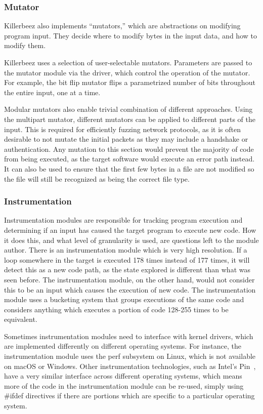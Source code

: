 \subsubsection{Mutator} \label{Mutator Overview}
Killerbeez also implements ``mutators,'' which are abstractions on modifying
program input. They decide where to modify bytes in the input data, and how
to modify them.

Killerbeez uses a selection of user-selectable mutators. Parameters are passed
to the mutator module via the driver, which control the operation of the
mutator. For example, the bit flip mutator flips a parametrized number of bits
throughout the entire input, one at a time.

Modular mutators also enable trivial combination of different approaches. Using
the multipart mutator, different mutators can be applied to different parts of
the input. This is required for efficiently fuzzing network protocols, as it is
often desirable to not mutate the initial packets as they may include a handshake or
authentication.  Any mutation to this section would prevent the majority of code from being
executed, as the target software would execute an error path instead. It can
also be used to ensure that the first few bytes in a file are not modified so
the file will still be recognized as being the correct file type.


\subsubsection{Instrumentation} \label{Instrumentation Overview}
Instrumentation modules are responsible for tracking program execution and
determining if an input has caused the target program to execute new code. How it does this,
and what level of granularity is used, are questions left to the module author.
There is an \IPT{} instrumentation module which is very high resolution.
If a loop somewhere in the target is executed 178 times instead of 177
times, it will detect this as a new code path, as the state explored is
different than what was seen before.  The \AFL{} instrumentation module, on the
other hand, would not consider this to be an input which causes the execution of new code.
The \AFL{} instrumentation module uses a bucketing system that groups executions of the same
code and considers anything which executes a portion of code 128-255 times to
be equivalent.

Sometimes instrumentation modules need to interface with kernel drivers, which are
implemented differently on different operating systems. For instance, the \IPT{}
instrumentation module uses the perf subsystem on Linux, which is not available
on macOS or Windows. Other instrumentation technologies, such as Intel's
Pin~\cite{pin}, have a very similar interface across different operating
systems, which means more of the code in the instrumentation module can be
re-used, simply using \#ifdef directives if there are portions which are
specific to a particular operating system.
